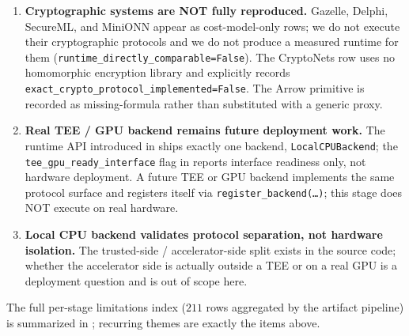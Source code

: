 \begin{enumerate}[leftmargin=*, nosep]
  \item \textbf{Cryptographic systems are NOT fully reproduced.} Gazelle, Delphi, SecureML, and MiniONN appear as cost-model-only rows; we do not execute their cryptographic protocols and we do not produce a measured runtime for them (\texttt{runtime\_directly\_comparable=False}). The CryptoNets row uses no homomorphic encryption library and explicitly records \texttt{exact\_crypto\_protocol\_implemented=False}. The Arrow primitive is recorded as missing-formula rather than substituted with a generic proxy.
  \item \textbf{Real TEE / GPU backend remains future deployment work.} The runtime API introduced in  ships exactly one backend, \texttt{LocalCPUBackend}; the \texttt{tee\_gpu\_ready\_interface} flag in  reports interface readiness only, not hardware deployment. A future TEE or GPU backend implements the same protocol surface and registers itself via \texttt{register\_backend(\ldots)}; this stage does NOT execute on real hardware.
  \item \textbf{Local CPU backend validates protocol separation, not hardware isolation.} The trusted-side / accelerator-side split exists in the source code; whether the accelerator side is actually outside a TEE or on a real GPU is a deployment question and is out of scope here.
\end{enumerate}

The full per-stage limitations index ($211$ rows aggregated by the artifact pipeline) is summarized in ; recurring themes are exactly the items above.

